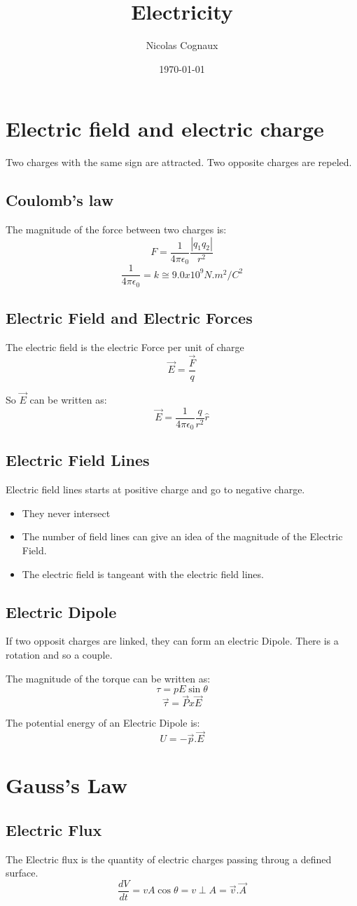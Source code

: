 \documentclass[11pt,a4paper,french]{article}
\title{Electricity}
\author{Nicolas Cognaux}
\date{\today}
\begin{document}
\maketitle

\section{Electric field and electric charge}
Two charges with the same sign are attracted. Two opposite charges are repeled.

\subsection{Coulomb's law}
The magnitude of the force between two charges is:
$$ F = \frac{1}{4\pi\epsilon_0}\frac{|q_1q_2|}{r^2} $$
$$ \frac{1}{4\pi\epsilon_0} = k \cong 9.0x10^9N.m^2/C^2$$


\subsection{Electric Field and Electric Forces}
The electric field is the electric Force per unit of charge
$$ \vec{E} = \frac{\vec{F}}{q} $$

So $\vec{E}$ can be written as:
$$ \vec{E} = \frac{1}{4\pi\epsilon_0}\frac{q}{r^2}\hat{r} $$

\subsection{Electric Field Lines}
Electric field lines starts at positive charge and go to negative charge.

\begin{itemize}
\item They never intersect
\item The number of field lines can give an idea of the magnitude of the Electric Field.
\item The electric field is tangeant with the electric field lines.
\end{itemize}

\subsection{Electric Dipole}
If two opposit charges are linked, they can form an electric Dipole. There is a rotation and so a couple.

The magnitude of the torque can be written as:
$$ \tau = pE\sin{\theta} $$
$$\vec{\tau} = \vec{P}x\vec{E} $$

The potential energy of an Electric Dipole is:
$$ U = -\vec{p}. \vec{E} $$

\section{Gauss's Law}
\subsection{Electric Flux}
The Electric flux is the quantity of electric charges passing throug a defined surface.
$$ \frac{dV}{dt} = vA\cos{\theta} = v \perp A = \vec{v}.\vec{A} $$
\end{document}
